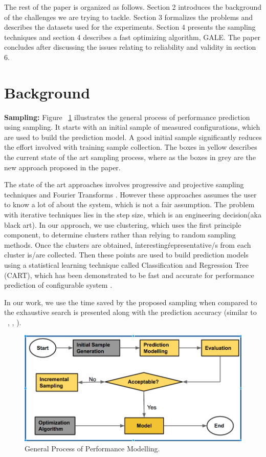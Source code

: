 \documentclass{sig-alternative}
\begin{document}
The rest of the paper is organized as follows. Section 2 introduces the background of the challenges we are trying to tackle. Section 3 formalizes the problems and describes the datasets used for the experiments. Section 4 presents the sampling techniques and section 4 describes a fast optimizing algorithm, GALE. The paper concludes after discussing the issues relating to reliability and validity in section 6. 
 
\section{Background}


    \textbf{Sampling: } Figure ~\ref{fig:GeneralProcess} illustrates the general process of performance prediction using sampling. It starts with an initial sample of measured configurations, which are used to build the prediction model. A good initial sample significantly reduces the effort involved with training sample collection. The boxes in yellow describes the current state of the art sampling process, where as the boxes in grey are the new approach proposed in the paper. 
    
    The state of the art approaches involves progressive and projective sampling techniques \cite{sarkar2015cost} and Fourier Transforms \cite{zhang2015performance}. However these approaches assumes the user to know a lot of about the system, which is not a fair assumption. The problem with iterative techniques lies in the step size, which is an engineering decision(aka black art). In our approach, we use clustering, which uses the first principle component, to determine clusters rather than relying to random sampling methods. Once the clusters are obtained, \'interesting\' representative/s from each cluster  is/are collected. Then these points are used to build prediction models using a statistical learning technique called Classification and Regression Tree (CART), which has been demonstrated to be fast and accurate for performance prediction of configurable system \cite{guo2013variability}.
    
In our work, we use the time saved by the proposed sampling when compared to the exhaustive search is presented along with the prediction accuracy (similar to ~\cite{guo2013variability}, \cite{siegmund2012predicting}, \cite{westermann2012automated}). 
    \begin{figure}[!t]
\includegraphics[width=1.2\linewidth]{Figures/GeneralProcess.png}
\caption{ General Process of Performance Modelling. }\label{fig:GeneralProcess}
\end{figure}
\end{document}
